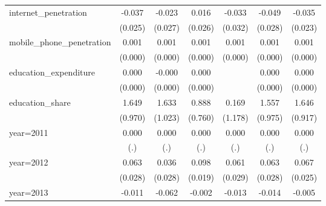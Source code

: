 \begin{table}[htbp]
\begin{tabular}{l*{6}{c}}
\addlinespace
internet\_penetration&      -0.037         &      -0.023         &       0.016         &      -0.033         &      -0.049\sym{*}  &      -0.035         \\
                    &     (0.025)         &     (0.027)         &     (0.026)         &     (0.032)         &     (0.028)         &     (0.023)         \\
\addlinespace
mobile\_phone\_penetration&       0.001\sym{**} &       0.001\sym{***}&       0.001         &       0.001\sym{***}&       0.001         &       0.001         \\
                    &     (0.000)         &     (0.000)         &     (0.000)         &     (0.000)         &     (0.000)         &     (0.000)         \\
\addlinespace
education\_expenditure&       0.000         &      -0.000         &       0.000\sym{*}  &                     &       0.000         &       0.000\sym{*}  \\
                    &     (0.000)         &     (0.000)         &     (0.000)         &                     &     (0.000)         &     (0.000)         \\
\addlinespace
education\_share     &       1.649\sym{*}  &       1.633         &       0.888         &       0.169         &       1.557         &       1.646\sym{*}  \\
                    &     (0.970)         &     (1.023)         &     (0.760)         &     (1.178)         &     (0.975)         &     (0.917)         \\
\addlinespace
year=2011           &       0.000         &       0.000         &       0.000         &       0.000         &       0.000         &       0.000         \\
                    &         (.)         &         (.)         &         (.)         &         (.)         &         (.)         &         (.)         \\
\addlinespace
year=2012           &       0.063\sym{**} &       0.036         &       0.098\sym{***}&       0.061\sym{**} &       0.063\sym{**} &       0.067\sym{**} \\
                    &     (0.028)         &     (0.028)         &     (0.019)         &     (0.029)         &     (0.028)         &     (0.025)         \\
\addlinespace
year=2013           &      -0.011\sym{*}  &      -0.062         &      -0.002         &      -0.013         &      -0.014\sym{*}  &      -0.005         \\

\end{tabular}
\end{table}
